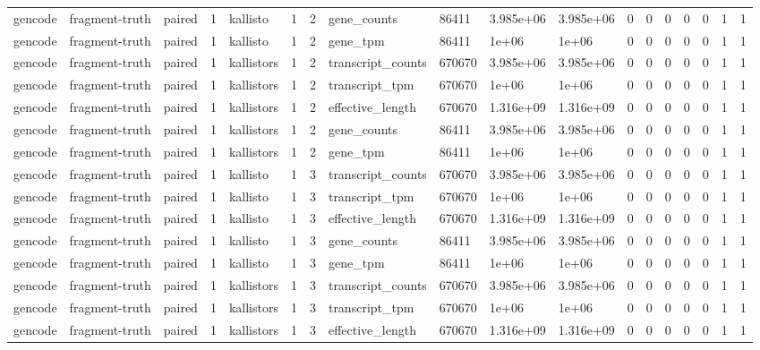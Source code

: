 \begin{tabular}{llllllllllllllllll}
gencode & fragment-truth & paired & 1 & kallisto & 1 & 2 & gene\_counts & 86411 & 3.985e+06 & 3.985e+06 & 0 & 0 & 0 & 0 & 0 & 1 & 1 \\
gencode & fragment-truth & paired & 1 & kallisto & 1 & 2 & gene\_tpm & 86411 & 1e+06 & 1e+06 & 0 & 0 & 0 & 0 & 0 & 1 & 1 \\
gencode & fragment-truth & paired & 1 & kallistors & 1 & 2 & transcript\_counts & 670670 & 3.985e+06 & 3.985e+06 & 0 & 0 & 0 & 0 & 0 & 1 & 1 \\
gencode & fragment-truth & paired & 1 & kallistors & 1 & 2 & transcript\_tpm & 670670 & 1e+06 & 1e+06 & 0 & 0 & 0 & 0 & 0 & 1 & 1 \\
gencode & fragment-truth & paired & 1 & kallistors & 1 & 2 & effective\_length & 670670 & 1.316e+09 & 1.316e+09 & 0 & 0 & 0 & 0 & 0 & 1 & 1 \\
gencode & fragment-truth & paired & 1 & kallistors & 1 & 2 & gene\_counts & 86411 & 3.985e+06 & 3.985e+06 & 0 & 0 & 0 & 0 & 0 & 1 & 1 \\
gencode & fragment-truth & paired & 1 & kallistors & 1 & 2 & gene\_tpm & 86411 & 1e+06 & 1e+06 & 0 & 0 & 0 & 0 & 0 & 1 & 1 \\
gencode & fragment-truth & paired & 1 & kallisto & 1 & 3 & transcript\_counts & 670670 & 3.985e+06 & 3.985e+06 & 0 & 0 & 0 & 0 & 0 & 1 & 1 \\
gencode & fragment-truth & paired & 1 & kallisto & 1 & 3 & transcript\_tpm & 670670 & 1e+06 & 1e+06 & 0 & 0 & 0 & 0 & 0 & 1 & 1 \\
gencode & fragment-truth & paired & 1 & kallisto & 1 & 3 & effective\_length & 670670 & 1.316e+09 & 1.316e+09 & 0 & 0 & 0 & 0 & 0 & 1 & 1 \\
gencode & fragment-truth & paired & 1 & kallisto & 1 & 3 & gene\_counts & 86411 & 3.985e+06 & 3.985e+06 & 0 & 0 & 0 & 0 & 0 & 1 & 1 \\
gencode & fragment-truth & paired & 1 & kallisto & 1 & 3 & gene\_tpm & 86411 & 1e+06 & 1e+06 & 0 & 0 & 0 & 0 & 0 & 1 & 1 \\
gencode & fragment-truth & paired & 1 & kallistors & 1 & 3 & transcript\_counts & 670670 & 3.985e+06 & 3.985e+06 & 0 & 0 & 0 & 0 & 0 & 1 & 1 \\
gencode & fragment-truth & paired & 1 & kallistors & 1 & 3 & transcript\_tpm & 670670 & 1e+06 & 1e+06 & 0 & 0 & 0 & 0 & 0 & 1 & 1 \\
gencode & fragment-truth & paired & 1 & kallistors & 1 & 3 & effective\_length & 670670 & 1.316e+09 & 1.316e+09 & 0 & 0 & 0 & 0 & 0 & 1 & 1 \\

\end{tabular}
